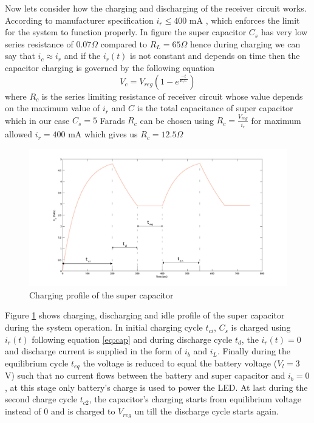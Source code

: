 Now lets consider how the charging and discharging of the receiver circuit works. According to manufacturer specification $i_r \leq 400 $ mA , which enforces the limit for the system to function properly.
In figure %
the super capacitor $C_s$ has very low series resistance of $0.07 \Omega$ compared to $R_L = 65 \Omega$ hence during charging we can say that $i_c \approx i_r$ and if the $i_r(t)$ is not constant and depends on time then the capacitor charging is governed by the following equation
\begin{equation}\label{eq:cap}
 V_c = V_{reg} \left(1 - e^{\frac{-t}{R_cC}}\right)
\end{equation}
where $R_c$ is the series limiting resistance of receiver circuit whose value depends on the maximum value of $i_r$ and $C$ is the total capacitance of super capacitor which in our case $C_s = 5 $ Farads
$R_c$ can be chosen using $R_c = \frac { V_{reg}}{i_r} $ for maximum allowed $i_r = 400$ mA which gives us $R_c = 12.5 \Omega$

\begin{figure}[h!]
\centering
\includegraphics[width=1\textwidth]{cd_cycle.pdf}
\caption{Charging profile of the super capacitor }
\label{fig:ch_profile}
\end{figure}

Figure \ref{fig:ch_profile} shows charging, discharging and idle profile of the super capacitor during the system operation. In initial charging cycle $t_{ci}$, $C_s$ is charged using $i_r(t)$ following equation \ref{eq:cap} and during discharge cycle $t_d$, the $i_r(t) = 0$ and discharge current is supplied in the form of $i_b$ and $i_L$. Finally during the equilibrium cycle $t_{eq}$ the voltage is reduced to equal the battery voltage ($V_l = 3$ V) such that no current flows between the battery and super capacitor and $i_b = 0$, at this stage only battery's charge is used to power the LED. At last during the second charge cycle $t_{c2}$, the capacitor's charging starts from equilibrium voltage instead of 0 and is charged to $V_{reg}$ un till the discharge cycle starts again.
